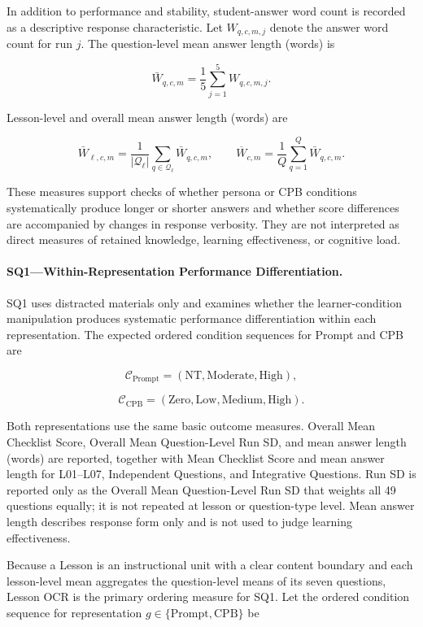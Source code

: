 In addition to performance and stability, student-answer word count is recorded as a descriptive response characteristic. Let $W_{q,c,m,j}$ denote the answer word count for run $j$. The question-level mean answer length (words) is

\[
\bar W_{q,c,m}
=
\frac{1}{5}
\sum_{j=1}^{5}W_{q,c,m,j}.
\]

Lesson-level and overall mean answer length (words) are

\[
\bar W_{\ell,c,m}
=
\frac{1}{|\mathcal Q_\ell|}
\sum_{q\in\mathcal Q_\ell}\bar W_{q,c,m},
\qquad
\overline W_{c,m}
=
\frac{1}{Q}
\sum_{q=1}^{Q}\bar W_{q,c,m}.
\]

These measures support checks of whether persona or CPB conditions systematically produce longer or shorter answers and whether score differences are accompanied by changes in response verbosity. They are not interpreted as direct measures of retained knowledge, learning effectiveness, or cognitive load.

\paragraph{SQ1---Within-Representation Performance Differentiation.}

SQ1 uses distracted materials only and examines whether the learner-condition manipulation produces systematic performance differentiation within each representation. The expected ordered condition sequences for Prompt and CPB are

\[
\mathcal C_{\mathrm{Prompt}}
=
(\mathrm{NT},\mathrm{Moderate},\mathrm{High}),
\]

\[
\mathcal C_{\mathrm{CPB}}
=
(\mathrm{Zero},\mathrm{Low},\mathrm{Medium},\mathrm{High}).
\]

Both representations use the same basic outcome measures. Overall Mean Checklist Score, Overall Mean Question-Level Run SD, and mean answer length (words) are reported, together with Mean Checklist Score and mean answer length for L01--L07, Independent Questions, and Integrative Questions. Run SD is reported only as the Overall Mean Question-Level Run SD that weights all 49 questions equally; it is not repeated at lesson or question-type level. Mean answer length describes response form only and is not used to judge learning effectiveness.

Because a Lesson is an instructional unit with a clear content boundary and each lesson-level mean aggregates the question-level means of its seven questions, Lesson OCR is the primary ordering measure for SQ1. Let the ordered condition sequence for representation $g\in\{\mathrm{Prompt},\mathrm{CPB}\}$ be

